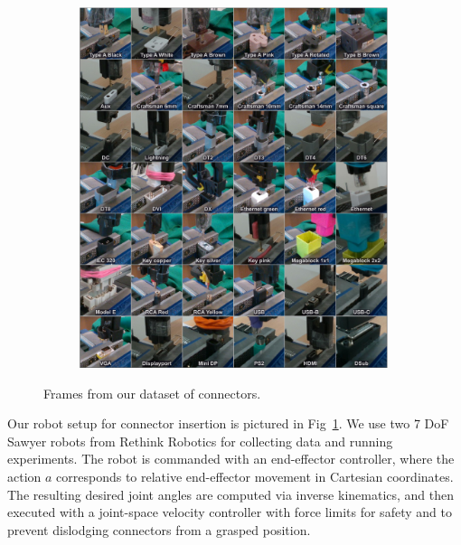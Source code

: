 \begin{figure}[t]
    \centering
    \begin{subfigure}[b]{0.99\linewidth}
        \center
        \includegraphics[width=0.99\textwidth]{daib/imgs/connectors.pdf}
    \end{subfigure}

    \caption{Frames from our dataset of \numconnectors{} connectors.}
    \label{fig:connectortable}
    \vspace{-0.5cm}
\end{figure}

Our robot setup for connector insertion is pictured in Fig~\ref{fig:connectortable}. We use two 7 DoF Sawyer robots from Rethink Robotics for collecting data and running experiments. The robot is commanded with an end-effector controller, where the action $a$ corresponds to relative end-effector movement in Cartesian coordinates. The resulting desired joint angles are computed via inverse kinematics, and then executed with a joint-space velocity controller with force limits for safety and to prevent dislodging connectors from a grasped position.

